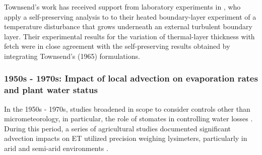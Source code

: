 \documentclass{article}
\begin{document}


    Townsend's work has received support from laboratory experiments in \citet{antonia1977response}, who apply a self-preserving analysis to to their heated boundary-layer experiment of a temperature disturbance that grows underneath an external turbulent boundary layer. Their experimental results for the variation of thermal-layer thickness with fetch were in close agreement with the self-preserving results obtained by integrating Townsend's (1965) formulations.


    \subsubsection*{1950s - 1970s: Impact of local advection on evaporation rates and plant water status}

    In the 1950s - 1970s, studies broadened in scope to consider controls other than micrometeorology, in particular, the role of stomates in controlling water losses  \cite{el1965effects, millar1964effect}.
    During this period, a series of agricultural studies documented significant advection impacts on ET utilized precision weighing lysimeters, particularly in arid and semi-arid environments \cite{rosenberg_extreme_1978}. 

\end{document}
